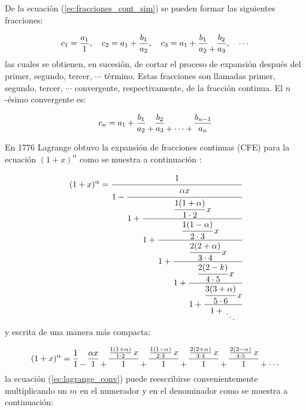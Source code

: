 	De la ecuación (\ref{ec:fracciones_cont_sim}) se pueden formar las siguientes fracciones:

	\begin{equation}
		c_{1} = \frac{a_{1}}{1} , \quad c_{2} = a_{1} + \frac{b_{1}}{a_{2}}, \quad c_{3} = a_{1} + \frac{b_{1}}{a_{2}} \genfrac{}{}{0pt}{0}{}{+} \frac{b_{2}}{a_{3}}, \quad \cdots
	\end{equation}
	las cuales se obtienen, en sucesión, de cortar el proceso de expansión después del primer, segundo, tercer, $\cdots$ término. Estas fracciones son llamadas primer, segundo, tercer, $\cdots$  convergente, respectivamente, de la fracción continua. El $n$-ésimo convergente es:

	\begin{equation}
		c_{n} = a_{1} + \frac{b_{1}}{a_{2}} \genfrac{}{}{0pt}{0}{}{+} \frac{b_{2}}{a_{3}} \genfrac{}{}{0pt}{0}{}{+} \genfrac{}{}{0pt}{0}{}{\cdots} \genfrac{}{}{0pt}{0}{}{+} \frac{b_{n-1}}{a_{n}}
	\end{equation}

	En 1776 Lagrange obtuvo la expansión de fracciones continuas (CFE) para la ecuación $(1 + x)^{\alpha}$ como se muestra a continuación \cite{Olds2009}:

	\begin{equation}
 		(1 + x)^{\alpha} = \cfrac{1}{1 - \cfrac{\alpha x}{1 + \cfrac{\cfrac{1(1 + \alpha)}{1\cdot2}\,x}{1 + \cfrac{\cfrac{1(1 - \alpha)}{2\cdot3}\,x}{1 + \cfrac{\cfrac{2(2 + \alpha)}{3\cdot4}\,x}{1 + \cfrac{\cfrac{2(2 - k)}{4\cdot5}\,x}{1 + \cfrac{\cfrac{3(3 + \alpha)}{5\cdot6}\,x}{1 + \genfrac{}{}{0pt}{0}{}{\ddots}}}}}}}}
		 \label{ec:lagrange}
	\end{equation}
	y escrita de una manera más compacta:

	\begin{equation}
 		(1 + x)^{\alpha} = \frac{1}{1} \genfrac{}{}{0pt}{0}{}{-} \frac{\alpha x}{1} \genfrac{}{}{0pt}{0}{}{+} \frac{\frac{1(1 + \alpha)}{1\cdot2}\,x}{1} \genfrac{}{}{0pt}{0}{}{+} \frac{\frac{1(1 - \alpha)}{2\cdot3}\,x}{1} \genfrac{}{}{0pt}{0}{}{+} \frac{\frac{2(2 + \alpha)}{3\cdot4}\,x}{1} \genfrac{}{}{0pt}{0}{}{+} \frac{\frac{2(2 - \alpha)}{4\cdot5}\,x}{1} \genfrac{}{}{0pt}{0}{}{+} \genfrac{}{}{0pt}{0}{}{\cdots} 
		\label{ec:lagrange_conv}
	\end{equation}
	la ecuación (\ref{ec:lagrange_conv}) puede reescribirse convenientemente multiplicando un $m$ en el numerador y en el denominador como se muestra a continuación:

